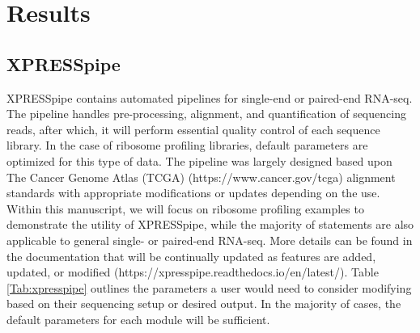 \documentclass[11pt, a4paper, oneside]{article}
\begin{document}
\section{Results}

\subsection{XPRESSpipe}
XPRESSpipe contains automated pipelines for single-end or paired-end RNA-seq. The pipeline handles pre-processing, alignment, and quantification of sequencing reads, after which, it will perform essential quality control of each sequence library. In the case of ribosome profiling libraries, default parameters are optimized for this type of data. The pipeline was largely designed based upon The Cancer Genome Atlas (TCGA) (https://www.cancer.gov/tcga) alignment standards with appropriate modifications or updates depending on the use. Within this manuscript, we will focus on ribosome profiling examples to demonstrate the utility of XPRESSpipe, while the majority of statements are also applicable to general single- or paired-end RNA-seq. More details can be found in the documentation that will be continually updated as features are added, updated, or modified (https://xpresspipe.readthedocs.io/en/latest/). Table \ref{Tab:xpresspipe} outlines the parameters a user would need to consider modifying based on their sequencing setup or desired output. In the majority of cases, the default parameters for each module will be sufficient.
\end{document}
